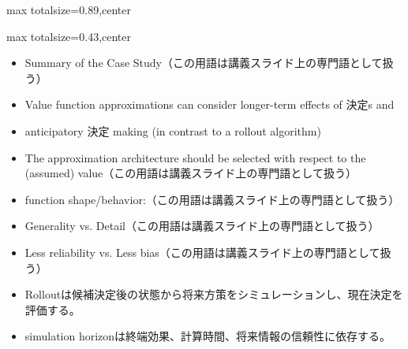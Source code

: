 \begin{minipage}[t]{0.58\textwidth}
\begin{adjustbox}{max totalsize={\textwidth}{0.89\textheight},center}
\begin{minipage}{\textwidth}
\end{minipage}
\end{adjustbox}
\end{minipage}


\clearpage
{}
\begin{minipage}[t]{0.405\textwidth}
\begin{adjustbox}{max totalsize={\textwidth}{0.43\textheight},center}
\begin{minipage}{\textwidth}\scriptsize
{}\begin{itemize}
\item Summary of the Case Study（この用語は講義スライド上の専門語として扱う）
\item Value function approximations can consider longer-term effects of 決定s and
\item anticipatory 決定 making (in contrast to a rollout algorithm)
\item The approximation architecture should be selected with respect to the (assumed) value（この用語は講義スライド上の専門語として扱う）
\item function shape/behavior:（この用語は講義スライド上の専門語として扱う）
\item Generality vs. Detail（この用語は講義スライド上の専門語として扱う）
\item Less reliability vs. Less bias（この用語は講義スライド上の専門語として扱う）
\end{itemize}\begin{itemize}
\item Rolloutは候補決定後の状態から将来方策をシミュレーションし、現在決定を評価する。
\item simulation horizonは終端効果、計算時間、将来情報の信頼性に依存する。
\end{itemize}
\end{minipage}
\end{adjustbox}
\end{minipage}\hfill
